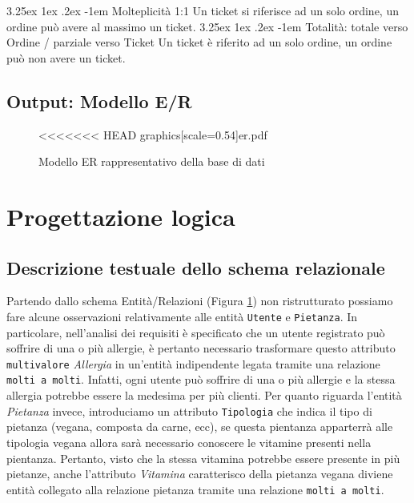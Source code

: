 \documentclass[10pt]{article}
\makeatletter
\renewcommand\paragraph{\@startsection{paragraph}{5}{\z@}%
	  {3.25ex \@plus1ex \@minus.2ex}%
	  {-1em}%
	  {\normalfont\normalsize\bfseries}}
\makeatother
\begin{document}
				\paragraph{Molteplicità 1:1} Un ticket si riferisce ad un solo ordine, un ordine può avere al massimo un ticket.
				\paragraph{Totalità: totale verso Ordine / parziale verso Ticket} Un ticket è riferito ad un solo ordine, un ordine può non avere un ticket.
		\subsection{Output: Modello E/R}
		\begin{figure}[H]
			\begin{center}
				\hspace*{-1cm}%
<<<<<<< HEAD
graphics[scale=0.54]{er.pdf}%
				\hspace*{-1cm}%
			\end{center}			
			\caption{Modello ER rappresentativo della base di dati \label{fig:ER1}}
		\end{figure}
	\section{Progettazione logica}
		\subsection{Descrizione testuale dello schema relazionale}
		Partendo dallo schema Entità/Relazioni (Figura \ref{fig:ER1}) non ristrutturato possiamo fare alcune osservazioni relativamente alle entità \texttt{Utente} e \texttt{Pietanza}. In particolare, nell'analisi dei requisiti \`e specificato che un utente registrato pu\`o soffrire di una o pi\`u allergie, \`e pertanto necessario trasformare questo attributo \texttt{multivalore} \textit{Allergia} in un'entit\`a indipendente legata tramite una relazione \texttt{molti a molti}. Infatti, ogni utente pu\`o soffrire di una o pi\`u allergie e la stessa allergia potrebbe essere la medesima per pi\`u clienti. Per quanto riguarda l'entit\`a \textit{Pietanza} invece, introduciamo un attributo \texttt{Tipologia} che indica il tipo di pietanza (vegana, composta da carne, ecc), se questa pientanza apparterrà alle tipologia vegana allora sarà necessario conoscere le vitamine presenti nella pientanza. Pertanto, visto che la stessa vitamina potrebbe essere presente in più pietanze, anche l'attributo \textit{Vitamina} caratterisco della pietanza vegana diviene entità collegato alla relazione pietanza tramite una relazione \texttt{molti a molti}.  
\end{document}
